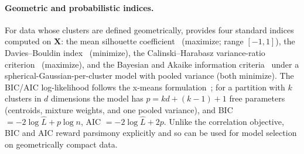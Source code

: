 \paragraph*{Geometric and probabilistic indices.}
For data whose clusters are defined geometrically, \tool{} provides four
standard indices computed on $\mathbf{X}$: the mean silhouette
coefficient~\cite{Rousseeuw1987} (maximize; range $[-1,1]$), the Davies--Bouldin
index~\cite{DaviesBouldin1979} (minimize), the Calinski--Harabasz
variance-ratio criterion~\cite{CalinskiHarabasz1974} (maximize), and the
Bayesian and Akaike information criteria~\cite{Schwarz1978,Akaike1974} under a
spherical-Gaussian-per-cluster model with pooled variance (both minimize). The
BIC/AIC log-likelihood follows the x-means formulation~\cite{Pelyhe2000}; for a
partition with $k$ clusters in $d$ dimensions the model has
$p = kd + (k-1) + 1$ free parameters (centroids, mixture weights, and one pooled
variance), and BIC $=-2\log\hat{L} + p\log n$, AIC $=-2\log\hat{L} + 2p$. Unlike
the correlation objective, BIC and AIC reward parsimony explicitly and so can be
used for model selection on geometrically compact data.

